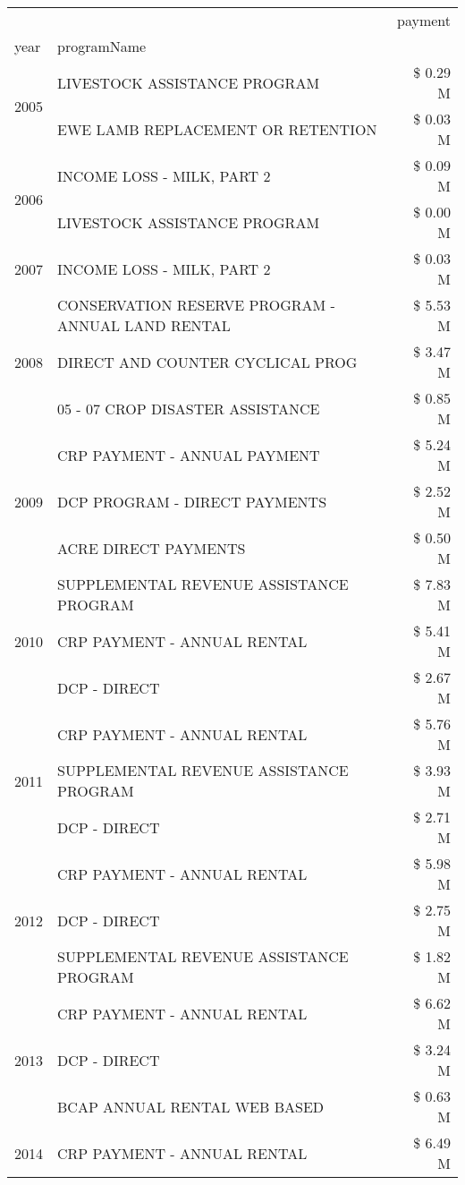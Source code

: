 \begin{tabular}{llr}
\toprule
 &  & payment \\
year & programName &  \\
\midrule
\multirow[t]{2}{*}{2005} & LIVESTOCK ASSISTANCE PROGRAM & \$ 0.29 M \\
 & EWE LAMB REPLACEMENT OR RETENTION & \$ 0.03 M \\
\cline{1-3}
\multirow[t]{2}{*}{2006} & INCOME LOSS - MILK, PART 2 & \$ 0.09 M \\
 & LIVESTOCK ASSISTANCE PROGRAM & \$ 0.00 M \\
\cline{1-3}
2007 & INCOME LOSS - MILK, PART 2 & \$ 0.03 M \\
\cline{1-3}
\multirow[t]{3}{*}{2008} & CONSERVATION RESERVE PROGRAM - ANNUAL LAND RENTAL & \$ 5.53 M \\
 & DIRECT AND COUNTER CYCLICAL PROG & \$ 3.47 M \\
 & 05 - 07 CROP DISASTER ASSISTANCE & \$ 0.85 M \\
\cline{1-3}
\multirow[t]{3}{*}{2009} & CRP PAYMENT - ANNUAL PAYMENT & \$ 5.24 M \\
 & DCP PROGRAM - DIRECT PAYMENTS & \$ 2.52 M \\
 & ACRE DIRECT PAYMENTS & \$ 0.50 M \\
\cline{1-3}
\multirow[t]{3}{*}{2010} & SUPPLEMENTAL REVENUE ASSISTANCE PROGRAM & \$ 7.83 M \\
 & CRP PAYMENT - ANNUAL RENTAL & \$ 5.41 M \\
 & DCP - DIRECT & \$ 2.67 M \\
\cline{1-3}
\multirow[t]{3}{*}{2011} & CRP PAYMENT - ANNUAL RENTAL & \$ 5.76 M \\
 & SUPPLEMENTAL REVENUE ASSISTANCE PROGRAM & \$ 3.93 M \\
 & DCP - DIRECT & \$ 2.71 M \\
\cline{1-3}
\multirow[t]{3}{*}{2012} & CRP PAYMENT - ANNUAL RENTAL & \$ 5.98 M \\
 & DCP - DIRECT & \$ 2.75 M \\
 & SUPPLEMENTAL REVENUE ASSISTANCE PROGRAM & \$ 1.82 M \\
\cline{1-3}
\multirow[t]{3}{*}{2013} & CRP PAYMENT - ANNUAL RENTAL & \$ 6.62 M \\
 & DCP - DIRECT & \$ 3.24 M \\
 & BCAP ANNUAL RENTAL WEB BASED & \$ 0.63 M \\
\cline{1-3}
\multirow[t]{3}{*}{2014} & CRP PAYMENT - ANNUAL RENTAL & \$ 6.49 M \\

\end{tabular}
